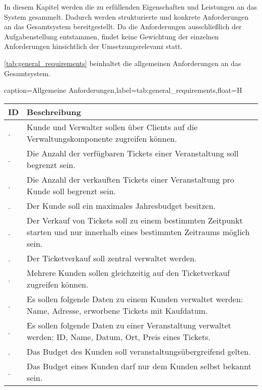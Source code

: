 In diesem Kapitel werden die zu erfüllenden Eigenschaften und Leistungen an das System gesammelt. Dadurch werden strukturierte und konkrete Anforderungen an das Gesamtsystem bereitgestellt.
Da die Anforderungen ausschließlich der Aufgabenstellung entstammen, findet keine Gewichtung der einzelnen Anforderungen hinsichtlich der Umsetzungsrelevanz statt.

\autoref{tab:general_requirements} beinhaltet die allgemeinen Anforderungen an das Gesamtsystem.

\newcommand\inctablenumber{\stepcounter{tablenumber}}
\newcommand\tablenumber{\arabic{tablenumber}}
\newcommand\incrownumber{\stepcounter{rownumber}}
\newcommand\rownumber{\arabic{rownumber}}
\setcounter{tablenumber}{1}
\setcounter{rownumber}{1}
\begin{dhbwtable}{caption={Allgemeine Anforderungen},label=tab:general_requirements,float=H}
    \begin{tabularx}{\textwidth}{l | X}
        \toprule
        \textbf{ID} & \textbf{Beschreibung}  \\\midrule
        \tablenumber .\rownumber & Kunde und Verwalter sollen über Clients auf die Verwaltungskomponente zugreifen können. \\\midrule\incrownumber
        \tablenumber .\rownumber & Die Anzahl der verfügbaren Tickets einer Veranstaltung soll begrenzt sein. \\\midrule\incrownumber
        \tablenumber .\rownumber & Die Anzahl der verkauften Tickets einer Veranstaltung pro Kunde soll begrenzt sein. \\\midrule\incrownumber
        \tablenumber .\rownumber & Der Kunde soll ein maximales Jahresbudget besitzen. \\\midrule\incrownumber
        \tablenumber .\rownumber & Der Verkauf von Tickets soll zu einem bestimmten Zeitpunkt starten und nur innerhalb eines bestimmten Zeitraums möglich sein. \\\midrule\incrownumber
        \tablenumber .\rownumber & Der Ticketverkauf soll zentral verwaltet werden. \\\midrule\incrownumber
        \tablenumber .\rownumber & Mehrere Kunden sollen gleichzeitig auf den Ticketverkauf zugreifen können. \\\midrule\incrownumber
        \tablenumber .\rownumber & Es sollen folgende Daten zu einem Kunden verwaltet werden: Name, Adresse, erworbene Tickets mit Kaufdatum. \\\midrule\incrownumber
        \tablenumber .\rownumber & Es sollen folgende Daten zu einer Veranstaltung verwaltet werden: ID, Name, Datum, Ort, Preis eines Tickets. \\\midrule\incrownumber
        \tablenumber .\rownumber & Das Budget des Kunden soll veranstaltungsübergreifend gelten. \\\midrule\incrownumber
        \tablenumber .\rownumber & Das Budget eines Kunden darf nur dem Kunden selbst bekannt sein.  \\\bottomrule
    \end{tabularx}    
\end{dhbwtable}

